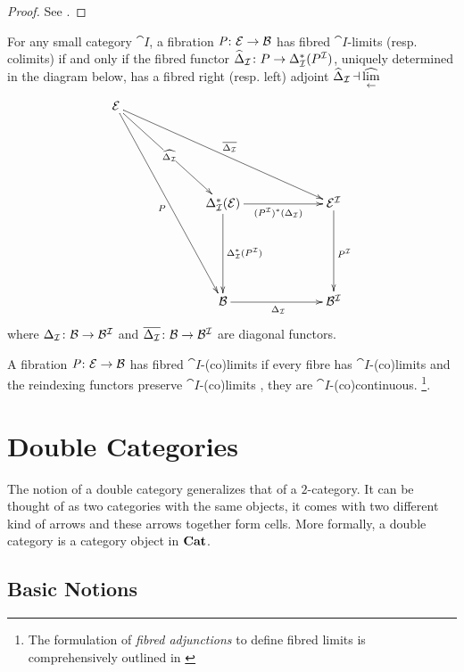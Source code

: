 \documentclass[9pt, leqno]{amsart}
\begin{document}
\begin{proof}
	See \cite[Proposition 3.6]{Gray}.
\end{proof}

\begin{defn}
	For any small category $\cat{I}$, a fibration $\operatorname{\textit{P} \colon \mathcal{E} \rightarrow \mathcal{B}}$ has fibred $\cat{I}$-limits (resp. colimits) if and only if the fibred functor $\widehat{\Delta}_{\mathcal{I}} \colon P \to \Delta_{\mathcal{I}}^*(P^{\mathcal{I}})$, uniquely determined in the diagram below, has a fibred right (resp. left) adjoint $\widehat{\Delta}_{\mathcal{I}} \operatorname{\dashv} \underset{\leftarrow}{\widehat{\text{lim}}}$
	\begin{equation*}
		\xymatrix@=1cm{
			\cat{E} \ar[ddddrr]_{P} \ar[ddrr]|{\widehat{\Delta_\cat{I}}} \ar[ddrrrr]^{\overline{\Delta_{\cat{I}}}}\\
			\\
			&& \Delta_\cat{I}^*(\cat{E}) \ar[dd]^{\Delta_\cat{I}^*(P^\cat{I})} \ar[rr]_{(P^{\cat{I}})^*(\Delta_\cat{I})} && \cat{E}^{\cat{I}} \ar[dd]^{P^{\cat{I}}}\\
			\\
			&& \cat{B} \ar[rr]_{\Delta_\cat{I}} && \cat{B}^{\cat{I}}
		}
	\end{equation*}
	where $\Delta_{\mathcal{I}} \colon \mathcal{B} \to \mathcal{B}^{\mathcal{I}}$ and $\overline{\Delta_{\mathcal{I}}} \colon \mathcal{B} \to \mathcal{B}^{\mathcal{I}}$ are diagonal functors. 
	
	\begin{remark}
		A fibration $\operatorname{\textit{P} \colon \mathcal{E} \rightarrow \mathcal{B}}$ has fibred $\cat{I}$-(co)limits if every fibre has $\cat{I}$-(co)limits and the reindexing functors preserve $\cat{I}$-(co)limits \ie, they are $\cat{I}$-(co)continuous. \footnote{The formulation of \emph{fibred adjunctions} to define fibred limits is comprehensively outlined in \cite{Her99}}.
	\end{remark}
\end{defn}

\section{Double Categories}
The notion of a double category generalizes that of a $2$-category. It can be thought of as two categories with the same objects, \ie it comes with two different kind of arrows and these arrows together form cells. More formally, a double category is a category object in $\mathbf{Cat}$.
\subsection{Basic Notions}
\end{document}
